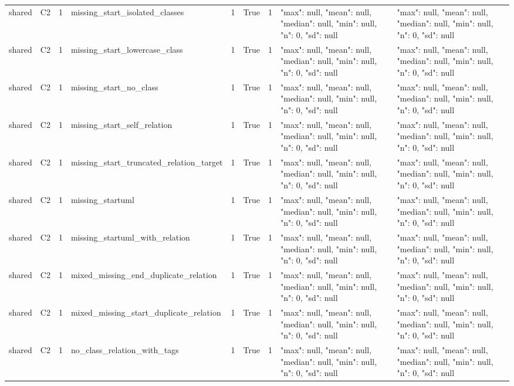 \begin{tabular}{lllllllll}
shared & C2 & 1 & missing\_start\_isolated\_classes & 1 & True & 1 & {"max": null, "mean": null, "median": null, "min": null, "n": 0, "sd": null} & {"max": null, "mean": null, "median": null, "min": null, "n": 0, "sd": null} \\
shared & C2 & 1 & missing\_start\_lowercase\_class & 1 & True & 1 & {"max": null, "mean": null, "median": null, "min": null, "n": 0, "sd": null} & {"max": null, "mean": null, "median": null, "min": null, "n": 0, "sd": null} \\
shared & C2 & 1 & missing\_start\_no\_class & 1 & True & 1 & {"max": null, "mean": null, "median": null, "min": null, "n": 0, "sd": null} & {"max": null, "mean": null, "median": null, "min": null, "n": 0, "sd": null} \\
shared & C2 & 1 & missing\_start\_self\_relation & 1 & True & 1 & {"max": null, "mean": null, "median": null, "min": null, "n": 0, "sd": null} & {"max": null, "mean": null, "median": null, "min": null, "n": 0, "sd": null} \\
shared & C2 & 1 & missing\_start\_truncated\_relation\_target & 1 & True & 1 & {"max": null, "mean": null, "median": null, "min": null, "n": 0, "sd": null} & {"max": null, "mean": null, "median": null, "min": null, "n": 0, "sd": null} \\
shared & C2 & 1 & missing\_startuml & 1 & True & 1 & {"max": null, "mean": null, "median": null, "min": null, "n": 0, "sd": null} & {"max": null, "mean": null, "median": null, "min": null, "n": 0, "sd": null} \\
shared & C2 & 1 & missing\_startuml\_with\_relation & 1 & True & 1 & {"max": null, "mean": null, "median": null, "min": null, "n": 0, "sd": null} & {"max": null, "mean": null, "median": null, "min": null, "n": 0, "sd": null} \\
shared & C2 & 1 & mixed\_missing\_end\_duplicate\_relation & 1 & True & 1 & {"max": null, "mean": null, "median": null, "min": null, "n": 0, "sd": null} & {"max": null, "mean": null, "median": null, "min": null, "n": 0, "sd": null} \\
shared & C2 & 1 & mixed\_missing\_start\_duplicate\_relation & 1 & True & 1 & {"max": null, "mean": null, "median": null, "min": null, "n": 0, "sd": null} & {"max": null, "mean": null, "median": null, "min": null, "n": 0, "sd": null} \\
shared & C2 & 1 & no\_class\_relation\_with\_tags & 1 & True & 1 & {"max": null, "mean": null, "median": null, "min": null, "n": 0, "sd": null} & {"max": null, "mean": null, "median": null, "min": null, "n": 0, "sd": null} \\

\end{tabular}
